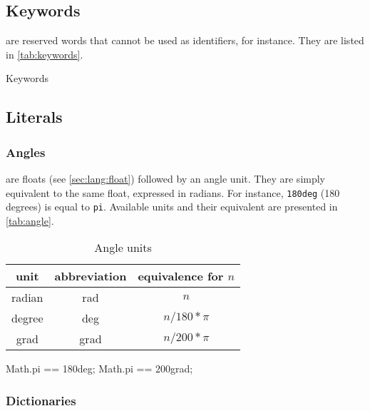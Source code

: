 \subsection{Keywords}
\label{sec:lang:keywords}

 are reserved words that cannot be used as identifiers,
for instance.  They are listed in \autoref{tab:keywords}.

\renewcommand{\baselinestretch}{.85}
\begin{table}[\floatpos]
  \centering
  
  \caption{Keywords}
  \label{tab:keywords}
\end{table}
\renewcommand{\baselinestretch}{1}

\subsection{Literals}

\subsubsection{Angles}

 are floats (see \autoref{sec:lang:float}) followed by an
angle unit. They are simply equivalent to the same float, expressed in
radians. For instance, \lstinline|180deg| (180 degrees) is equal to
\lstinline{pi}. Available units and their equivalent are presented in
\autoref{tab:angle}.

\begin{table}[\floatposh]
  \centering
  \begin{tabular}{|c|c|c|}
    \hline
    unit        & abbreviation & equivalence for $n$  \\
    \hline
    radian      & rad          & $n$         \\
    degree      & deg          & $n / 180 * \pi$        \\
    grad        & grad         & $n / 200 * \pi$        \\
    \hline
  \end{tabular}
  \caption{Angle units}
  \label{tab:angle}
\end{table}

\begin{urbiassert}
Math.pi == 180deg;
Math.pi == 200grad;
\end{urbiassert}

\subsubsection{Dictionaries}
\label{sec:lang:dictionary}



